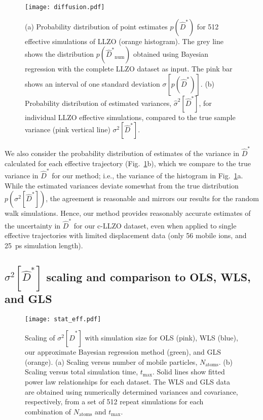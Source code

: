 \documentclass[reprint,superscriptaddress,nobibnotes,amsmath,amssymb,aps,prx,hidelinks,linenumbers]{revtex4-2}
\newcommand{\prob}[1]{\ensuremath{p(#1)}}
\newcommand{\Dest}{\ensuremath{\widehat{D}^*}}
\newcommand{\var}[1]{\ensuremath{\sigma^2[#1]}}
\newcommand{\varest}[1]{\ensuremath{\widehat{\sigma}^2[#1]}}
\begin{document}
\begin{figure}[tb]
    \centering
    \texttt{[image: diffusion.pdf]}
    \caption{
      (a) Probability distribution of point estimates $\prob{\Dest}$ for \num{512} effective simulations of LLZO (orange histogram).
      The grey line shows the distribution $\prob{\Dest_\mathrm{num}}$ obtained using Bayesian regression with the complete LLZO dataset as input.
      The pink bar shows an interval of one standard deviation $\sigma[\prob{\Dest}]$.
      (b) Probability distribution of estimated variances, $\varest{\Dest}$, for individual LLZO effective simulations, compared to the true sample variance (pink vertical line) $\var{\Dest}$.
    }
    \label{fig:diffusion}
\end{figure}

We also consider the probability distribution of estimates of the variance in $\Dest$ calculated for each effective trajectory (Fig.~\ref{fig:diffusion}b), which we compare to the true variance in $\Dest$ for our method; i.e., the variance of the histogram in Fig.~\ref{fig:diffusion}a.
While the estimated variances deviate somewhat from the true distribution $\prob{\var{\Dest}}$, the agreement is reasonable and mirrors our results for the random walk simulations.
Hence, our method provides reasonably accurate estimates of the uncertainty in $\Dest$ for our c-LLZO dataset, even when applied to single effective trajectories with limited displacement data (only 56 mobile ions, and \SI{25}{ps} simulation length).

\subsection{$\var{\Dest}$ scaling and comparison to OLS, WLS, and GLS}

\begin{figure}[htb]
    \centering
    \texttt{[image: stat\_eff.pdf]}
    \caption{
      Scaling of $\var{\Dest}$ with simulation size for OLS (pink), WLS (blue), our approximate Bayesian regression method (green), and GLS (orange).
      (a) Scaling versus number of mobile particles, $N_\mathrm{atoms}$.
      (b) Scaling versus total simulation time, $t_\mathrm{max}$.
      Solid lines show fitted power law relationships for each dataset.
      The WLS and GLS data are obtained using numerically determined variances and covariance, respectively, from a set of \num{512} repeat simulations for each combination of $N_\mathrm{atoms}$ and $t_\mathrm{max}$.
    }
    \label{fig:stat_eff}
\end{figure}
\end{document}
